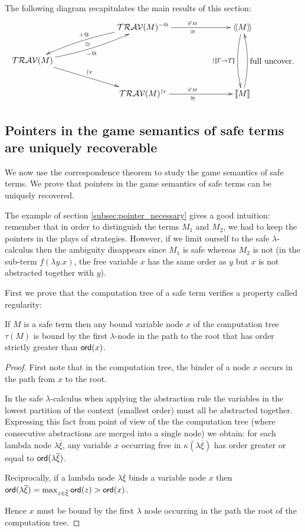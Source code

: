 The following diagram recapitulates the main results of this section:
$$
\xymatrix @C=6pc{
                                           & \travset(M)^{-@} \ar@/_/[dl]_{+@}  \ar[r]^{\varphi_M}_\cong & \intersem{M} \ar@/_/[dd]_{\upharpoonright \sem{\Gamma\rightarrow T}} \\
\travset(M) \ar@/_/[ur]_{-@}^{\cong} \ar[dr]^{\upharpoonright r}  \\
                                           & \travset(M)^{\upharpoonright r} \ar[r]^{\varphi_M}_\cong & \sem{M} \ar@/_/[uu]_{\mbox{full uncover.}}
}
$$



\subsection{Pointers in the game semantics of safe terms are uniquely recoverable}
We now use the correspondence theorem to study the game semantics of
safe terms. We prove that pointers in the game semantics of safe
terms can be uniquely recovered.

The example of section \ref{subsec:pointer_necessary} gives a good
intuition: remember that in order to distinguish the terms $M_1$ and
$M_2$, we had to keep the pointers in the plays of strategies.
However, if we limit ourself to the safe $\lambda$-calculus then the
ambiguity disappears since $M_1$ is safe whereas $M_2$ is not (in
the sub-term $f (\lambda y . x)$, the free variable $x$ has the same
order as $y$ but $x$ is not abstracted together with $y$).


First we prove that the computation tree of a safe term verifies a
property called regularity:
\begin{lem}
\label{lem:regularity}
If $M$ is a safe term then any bound variable node $x$ of the computation tree $\tau(M)$ is bound
by the first $\lambda$-node in the path to the root that has
order strictly greater than ${\sf ord}(x)$.
\end{lem}
\begin{proof}
First note that in the computation tree, the binder of a node $x$ occurs in the path from $x$ to the root.

In the safe $\lambda$-calculus when applying the abstraction rule the variables in the lowest partition of the context
(smallest order) must all be abstracted together. Expressing this fact from point of view of the the computation tree
(where consecutive abstractions are merged into a single node) we obtain:
for each lambda node $\lambda \overline{\xi}$, any variable $x$ occurring free in $\kappa(\lambda \overline{\xi})$
has order greater or equal to ${\sf ord}(\lambda \overline{\xi})$.

Reciprocally, if a lambda node $\lambda \overline{\xi}$ binds a variable node $x$ then ${\sf ord}(\lambda \overline{\xi}) = \max_{z\in\overline{\xi}} {\sf ord}(z) > {\sf ord}(x)$.

Hence $x$ must be bound by the first $\lambda$ node occurring in the path the root of the computation tree.
\end{proof}


